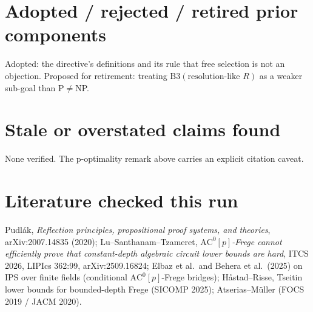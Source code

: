 \documentclass[11pt]{article}
\theoremstyle{definition}
\theoremstyle{remark}
\begin{document}
\section*{Adopted / rejected / retired prior components}
Adopted: the directive's definitions and its rule that free selection is not an objection. Proposed for
retirement: treating $\mathrm{B3}(\text{resolution-like }R)$ as a weaker sub-goal than P$\ne$NP.

\section*{Stale or overstated claims found}
None verified. The p-optimality remark above carries an explicit citation caveat.

\section*{Literature checked this run}
Pudl\'ak, \emph{Reflection principles, propositional proof systems, and theories}, arXiv:2007.14835 (2020);
Lu--Santhanam--Tzameret, \emph{$\mathrm{AC}^0[p]$-Frege cannot efficiently prove that constant-depth algebraic
circuit lower bounds are hard}, ITCS 2026, LIPIcs 362:99, arXiv:2509.16824; Elbaz et al.\ and Behera et al.\
(2025) on IPS over finite fields (conditional $\mathrm{AC}^0[p]$-Frege bridges); H{\aa}stad--Risse, Tseitin
lower bounds for bounded-depth Frege (SICOMP 2025); Atserias--M\"uller (FOCS 2019 / JACM 2020).
\end{document}
